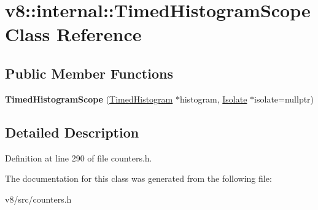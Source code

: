 \hypertarget{classv8_1_1internal_1_1TimedHistogramScope}{}\section{v8\+:\+:internal\+:\+:Timed\+Histogram\+Scope Class Reference}
\label{classv8_1_1internal_1_1TimedHistogramScope}
\subsection*{Public Member Functions}
\begin{DoxyCompactItemize}
\item 
\mbox{\label{classv8_1_1internal_1_1TimedHistogramScope_a2785c397d0533a6f8f675db74fd5270a}} 
{\bfseries Timed\+Histogram\+Scope} (\mbox{\hyperlink{classv8_1_1internal_1_1TimedHistogram}{Timed\+Histogram}} $\ast$histogram, \mbox{\hyperlink{classv8_1_1internal_1_1Isolate}{Isolate}} $\ast$isolate=nullptr)
\end{DoxyCompactItemize}


\subsection{Detailed Description}


Definition at line 290 of file counters.\+h.



The documentation for this class was generated from the following file\+:\begin{DoxyCompactItemize}
\item 
v8/src/counters.\+h\end{DoxyCompactItemize}
